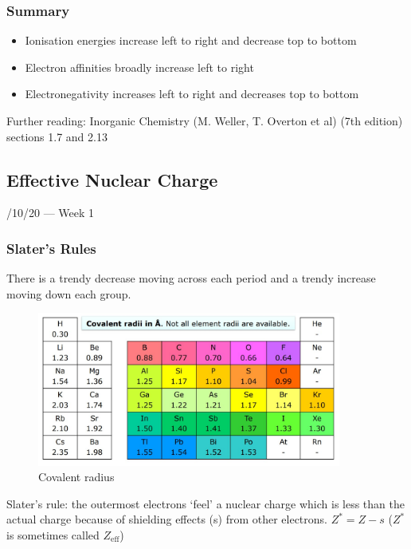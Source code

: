 \documentclass{article}
\newcommand{\thedate}[1]{\hfill{\small\sc #1}}
\begin{document}
    \subsubsection{Summary}
    \begin{itemize}
        \item Ionisation energies increase left to right and decrease top to bottom
        \item Electron affinities broadly increase left to right
        \item Electronegativity increases left to right and decreases top to bottom
    \end{itemize}
    Further reading: Inorganic Chemistry (M. Weller, T. Overton et al) (7th edition) sections 1.7 and 2.13
    \newpage

    \subsection{Effective Nuclear Charge}\thedate{28/10/20 --- Week 1}
    \subsubsection{Slater's Rules}
    There is a trendy decrease moving across each period and a trendy increase moving down each group.
    \begin{figure}[h]
        \centering
        \includegraphics[width=10cm]{covrad.jpg}
        \caption{Covalent radius}
    \end{figure}

    Slater's rule: the outermost electrons `feel' a nuclear charge which is less than the actual charge because
    of shielding effects (s) from other electrons. \(Z^* = Z - s\) (\(Z^*\) is sometimes called \(Z_{\text{eff}}\))
\end{document}
